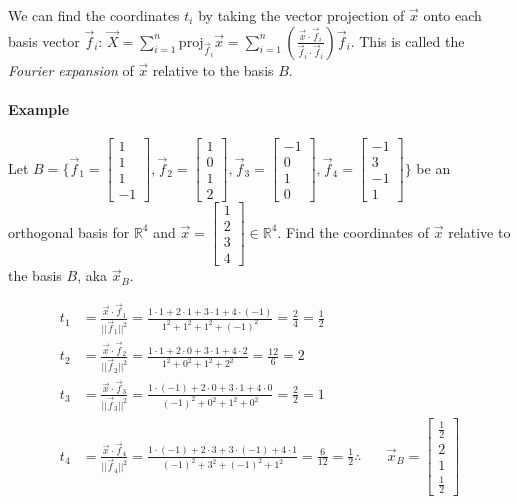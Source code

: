 We can find the coordinates $t_i$ by taking the vector projection of $\vec{x}$ onto each basis vector $\vec{f}_i$:
$\vec{X} = \sum_{i=1}^n \mathrm{proj}_{\vec{f}_i} \vec{x} = \sum_{i=1}^n \left( \frac{\vec{x} \cdot \vec{f}_i}{\vec{f}_i \cdot \vec{f}_i} \right) \vec{f}_i$.
This is called the \emph{Fourier expansion} of $\vec{x}$ relative to the basis $B$.

\paragraph*{Example}
Let $B = \{\vec{f}_1 = \begin{bmatrix}
    1 \\ 1 \\ 1 \\ -1
\end{bmatrix}, \vec{f}_2 = \begin{bmatrix}
    1 \\ 0 \\ 1 \\ 2
\end{bmatrix}, \vec{f}_3 = \begin{bmatrix}
    -1 \\ 0 \\ 1 \\ 0
\end{bmatrix}, \vec{f}_4 = \begin{bmatrix}
    -1 \\ 3 \\ -1 \\ 1
\end{bmatrix}\}$ be an orthogonal basis for $\mathbb{R}^4$ and $\vec{x} = \begin{bmatrix}
    1 \\ 2 \\ 3 \\ 4
\end{bmatrix} \in \mathbb{R}^4$. Find the coordinates of $\vec{x}$ relative to the basis $B$, aka $\vec{x}_B$.

\begin{align*}
t_1 &= \frac{\vec{x} \cdot \vec{f}_1}{||\vec{f}_1||^2} = \frac{1 \cdot 1 + 2 \cdot 1 + 3 \cdot 1 + 4 \cdot (-1)}{1^2 + 1^2 + 1^2 + (-1)^2} = \frac{2}{4} = \frac{1}{2} \\
t_2 &= \frac{\vec{x} \cdot \vec{f}_2}{||\vec{f}_2||^2} = \frac{1 \cdot 1 + 2 \cdot 0 + 3 \cdot 1 + 4 \cdot 2}{1^2 + 0^2 + 1^2 + 2^2} = \frac{12}{6} = 2 \\
t_3 &= \frac{\vec{x} \cdot \vec{f}_3}{||\vec{f}_3||^2} = \frac{1 \cdot (-1) + 2 \cdot 0 + 3 \cdot 1 + 4 \cdot 0}{(-1)^2 + 0^2 + 1^2 + 0^2} = \frac{2}{2} = 1 \\
t_4 &= \frac{\vec{x} \cdot \vec{f}_4}{||\vec{f}_4||^2} = \frac{1 \cdot (-1) + 2 \cdot 3 + 3 \cdot (-1) + 4 \cdot 1}{(-1)^2 + 3^2 + (-1)^2 + 1^2} = \frac{6}{12} = \frac{1}{2}
\therefore \quad & \vec{x}_B = \begin{bmatrix}
    \frac{1}{2} \\ 2 \\ 1 \\ \frac{1}{2}
\end{bmatrix}
\end{align*}

